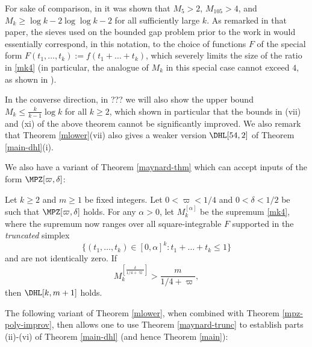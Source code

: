 For sake of comparison, in \cite[Proposition 4.3]{maynard-new} it was shown that $M_5 > 2$, $M_{105} > 4$, and $M_k \geq \log k - 2\log\log k - 2$ for all sufficiently large $k$.  As remarked in that paper, the sieves used on the bounded gap problem prior to the work in \cite{maynard-new} would essentially correspond, in this notation, to the choice of functions $F$ of the special form $F(t_1,\dots,t_k) := f(t_1+\dots+t_k)$, which severely limits the size of the ratio in
\eqref{mk4} (in particular, the analogue of $M_k$ in this special case cannot exceed $4$, as shown in \cite{sound}).

In the converse direction, in ??? we will also show the upper bound $M_k \leq \frac{k}{k-1} \log k$ for all $k \geq 2$, which shown in particular that the bounds in (vii) and (xi) of the above theorem cannot be significantly improved.  We also remark that Theorem \ref{mlower}(vii) also gives a weaker version $\DHL[54,2]$ of Theorem \ref{main-dhl}(i). 

We also have a variant of Theorem \ref{maynard-thm} which can accept inputs of the form $\MPZ[\varpi,\delta]$:

\begin{theorem}\label{maynard-trunc}  Let $k \geq 2$ and $m \geq 1$ be fixed integers. Let $0<\varpi<1/4$ and $0 <\delta < 1/2$ be such that $\MPZ[\varpi,\delta]$ holds.  For any $\alpha>0$, let $M_k^{[\alpha]}$ be the supremum \eqref{mk4}, where the supremum now ranges over all square-integrable $F$ supported in the \emph{truncated} simplex
\begin{equation}\label{ttk}
 \{ (t_1,\dots,t_k) \in [0,\alpha]^k: t_1+\dots+t_k \leq 1 \}
\end{equation}
and are not identically zero.  If
$$ M_k^{[\frac{\delta}{1/4+\varpi}]} > \frac{m}{1/4+\varpi},$$
then $\DHL[k,m+1]$ holds.
\end{theorem}

The following variant of Theorem \ref{mlower}, when combined with Theorem \ref{mpz-poly-improv}, then allows one to use Theorem \ref{maynard-trunc} to establish parts (ii)-(vi) of Theorem \ref{main-dhl} (and hence Theorem \ref{main}):

